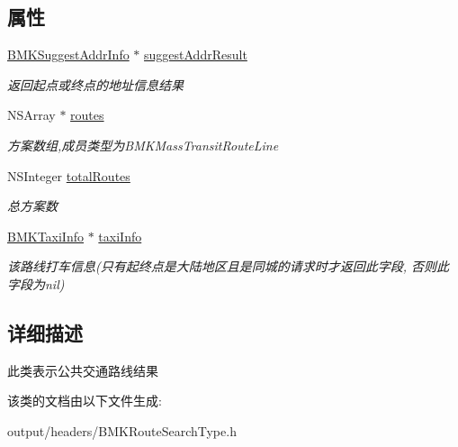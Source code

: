 \subsection*{属性}
\begin{DoxyCompactItemize}
\item 
\hypertarget{interface_b_m_k_mass_transit_route_result_ab8f692336c9ca7acc39bcddc18337333}{}\hyperlink{interface_b_m_k_suggest_addr_info}{B\+M\+K\+Suggest\+Addr\+Info} $\ast$ \hyperlink{interface_b_m_k_mass_transit_route_result_ab8f692336c9ca7acc39bcddc18337333}{suggest\+Addr\+Result}\label{interface_b_m_k_mass_transit_route_result_ab8f692336c9ca7acc39bcddc18337333}

\begin{DoxyCompactList}\small\item\em 返回起点或终点的地址信息结果 \end{DoxyCompactList}\item 
\hypertarget{interface_b_m_k_mass_transit_route_result_a51cb21ae8cd500365d304a03a143224a}{}N\+S\+Array $\ast$ \hyperlink{interface_b_m_k_mass_transit_route_result_a51cb21ae8cd500365d304a03a143224a}{routes}\label{interface_b_m_k_mass_transit_route_result_a51cb21ae8cd500365d304a03a143224a}

\begin{DoxyCompactList}\small\item\em 方案数组,成员类型为\+B\+M\+K\+Mass\+Transit\+Route\+Line \end{DoxyCompactList}\item 
\hypertarget{interface_b_m_k_mass_transit_route_result_a1e67ae5c32c4e30d96297c29de822c70}{}N\+S\+Integer \hyperlink{interface_b_m_k_mass_transit_route_result_a1e67ae5c32c4e30d96297c29de822c70}{total\+Routes}\label{interface_b_m_k_mass_transit_route_result_a1e67ae5c32c4e30d96297c29de822c70}

\begin{DoxyCompactList}\small\item\em 总方案数 \end{DoxyCompactList}\item 
\hypertarget{interface_b_m_k_mass_transit_route_result_a74d045e67138088cd881da0e0912a8d3}{}\hyperlink{interface_b_m_k_taxi_info}{B\+M\+K\+Taxi\+Info} $\ast$ \hyperlink{interface_b_m_k_mass_transit_route_result_a74d045e67138088cd881da0e0912a8d3}{taxi\+Info}\label{interface_b_m_k_mass_transit_route_result_a74d045e67138088cd881da0e0912a8d3}

\begin{DoxyCompactList}\small\item\em 该路线打车信息(只有起终点是大陆地区且是同城的请求时才返回此字段, 否则此字段为nil) \end{DoxyCompactList}\end{DoxyCompactItemize}


\subsection{详细描述}
此类表示公共交通路线结果 

该类的文档由以下文件生成\+:\begin{DoxyCompactItemize}
\item 
output/headers/B\+M\+K\+Route\+Search\+Type.\+h\end{DoxyCompactItemize}
